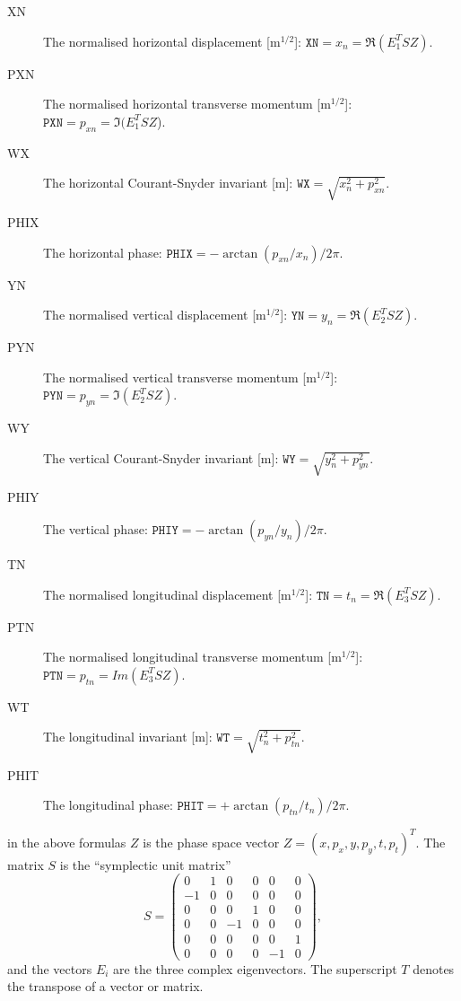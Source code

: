 \begin{description}
\item[XN]
  The normalised horizontal displacement [$\mathrm{m}^{1/2}$]:
  $\mathtt{XN} = x_n = \Re(E_1^T S Z)$.

\item[PXN]
  The normalised horizontal transverse momentum [$\mathrm{m}^{1/2}$]:
  $\mathtt{PXN} = p_{xn} = \Im(E_1^T S Z$).

\item[WX]
  The horizontal Courant-Snyder invariant [m]:
  $\mathtt{WX} = \sqrt{x_n^2 + p_{xn}^2}$.

\item[PHIX]
  The horizontal phase:
  $\mathtt{PHIX} = - \arctan(p_{xn} / x_n) / 2 \pi$.

\item[YN]
  The normalised vertical displacement [$\mathrm{m}^{1/2}$]:
  $\mathtt{YN} = y_n = \Re(E_2^T S Z)$.

\item[PYN]
  The normalised vertical transverse momentum [$\mathrm{m}^{1/2}$]:
  $\mathtt{PYN} = p_{yn} = \Im(E_2^T S Z)$.

\item[WY]
  The vertical Courant-Snyder invariant [m]:
  $\mathtt{WY} = \sqrt{y_n^2 + p_{yn}^2}$.

\item[PHIY]
  The vertical phase:
  $\mathtt{PHIY} = - \arctan(p_{yn} / y_n) / 2 \pi$.

\item[TN]
  The normalised longitudinal displacement [$\mathrm{m}^{1/2}$]:
  $\mathtt{TN} = t_n = \Re(E_3^T S Z)$.

\item[PTN]
  The normalised longitudinal transverse momentum [$\mathrm{m}^{1/2}$]:
  $\mathtt{PTN} = p_{tn} = Im(E_3^T S Z)$.

\item[WT]
  The longitudinal invariant [m]:
  $\mathtt{WT} = \sqrt{t_n^2 + p_{tn}^2}$.

\item[PHIT]
  The longitudinal phase:
  $\mathtt{PHIT} = + \arctan(p_{tn} / t_n) / 2 \pi$.

\end{description}
in the above formulas $Z$ is the phase space vector
$Z = (x, p_x, y, p_y, t, p_t)^T$.
The matrix $S$ is the ``symplectic unit matrix''
\[
S = 
\begin{pmatrix} 
    0 & 1 & 0 & 0 & 0 & 0 \\
   -1 & 0 & 0 & 0 & 0 & 0 \\
    0 & 0 & 0 & 1 & 0 & 0 \\
    0 & 0 &-1 & 0 & 0 & 0 \\
    0 & 0 & 0 & 0 & 0 & 1 \\
    0 & 0 & 0 & 0 &-1 & 0
  \end{pmatrix},
\]
and the vectors $E_i$ are the three complex eigenvectors.
The superscript $T$ denotes the transpose of a vector or matrix.

